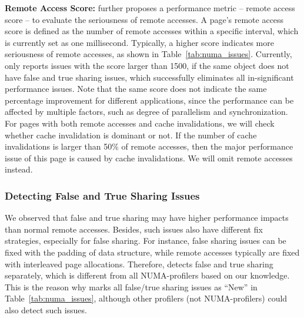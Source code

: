 \textbf{Remote Access Score:} \NP{} further proposes a performance metric -- remote access score -- to evaluate the seriousness of remote accesses. A page's remote access score is defined as the number of remote accesses within a specific interval, which is currently set as one millisecond. Typically, a higher score indicates more seriousness of remote accesses, as shown in Table~\ref{tab:numa_issues}. Currently, \NP{} only reports issues with the score larger than 1500, if the same object does not have false and true sharing issues, which successfully eliminates all in-significant performance issues. Note that the same  score does not indicate the same percentage improvement for different applications, since the performance can be affected by multiple factors, such as degree of parallelism and synchronization. For pages with both remote accesses and cache invalidations, we will check whether cache invalidation is dominant or not. If the number of cache invalidations is larger than 50\% of remote accesses, then the major performance issue of this page is caused by cache invalidations. We will omit remote accesses instead. 
 


   



\subsubsection{Detecting False and True Sharing Issues}
\label{sec: cacheline}

We observed that false and true sharing may have higher performance impacts than normal remote accesses. Besides, such issues also have different fix strategies, especially for false sharing. For instance, false sharing issues can be fixed with the padding of data structure, while remote accesses typically are fixed with interleaved page allocations. Therefore, \NP{} detects false and true sharing separately, which is different from all NUMA-profilers based on our knowledge. This is the reason why \NP{} marks all false/true sharing issues as ``New'' in Table~\ref{tab:numa_issues}, although other profilers (not NUMA-profilers) could also detect such issues.  

